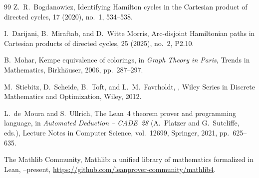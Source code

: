 \documentclass[11pt]{article}
\begin{document}
\begin{thebibliography}{99}
Z.~R.~Bogdanowicz,
\newblock Identifying Hamilton cycles in the Cartesian product of directed cycles,
 17 (2020), no.~1, 534--538.

I.~Darijani, B.~Miraftab, and D.~Witte Morris,
\newblock Arc-disjoint Hamiltonian paths in Cartesian products of directed cycles,
 25 (2025), no.~2, P2.10.

B.~Mohar,
\newblock Kempe equivalence of colorings,
\newblock in {\em Graph Theory in Paris}, Trends in Mathematics, Birkh\"auser, 2006, pp.~287--297.

M.~Stiebitz, D.~Scheide, B.~Toft, and L.~M.~Favrholdt,
,
\newblock Wiley Series in Discrete Mathematics and Optimization, Wiley, 2012.

L.~de~Moura and S.~Ullrich,
\newblock The Lean~4 theorem prover and programming language,
\newblock in {\em Automated Deduction -- CADE~28} (A.~Platzer and G.~Sutcliffe, eds.),
Lecture Notes in Computer Science, vol.~12699, Springer, 2021, pp.~625--635.

The Mathlib Community,
\newblock Mathlib: a unified library of mathematics formalized in Lean,
--present, \url{https://github.com/leanprover-community/mathlib4}.

\end{thebibliography}
\end{document}
